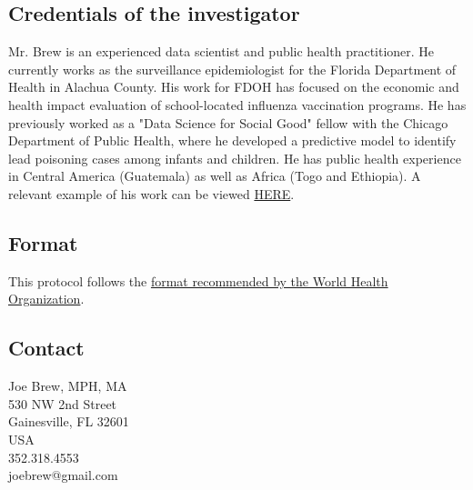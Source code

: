 \documentclass{article}
\begin{document}
\begin{multicols}{2}
\subsection*{Credentials of the investigator}

Mr. Brew is an experienced data scientist and public health practitioner.  He currently works as the surveillance epidemiologist for the Florida Department of Health in Alachua County.  His work for FDOH has focused on the economic and health impact evaluation of school-located influenza vaccination programs.  He has previously worked as a "Data Science for Social Good" fellow with the Chicago Department of Public Health, where he developed a predictive model to identify lead poisoning cases among infants and children. He has public health experience in Central America (Guatemala) as well as Africa (Togo and Ethiopia).  A relevant example of his work can be viewed \href{https://joebrew.shinyapps.io/sliv}{HERE}.


\subsection*{Format}
This protocol follows the \href{http://www.who.int/rpc/research_ethics/format_rp/en/}{format recommended by the World Health Organization}. \\

\vfill
\columnbreak

\subsection*{Contact}
Joe Brew, MPH, MA\\
530 NW 2nd Street \\
Gainesville, FL 32601 \\
USA \\
352.318.4553 \\
joebrew@gmail.com


\end{multicols}
% 
% 
\end{document}
